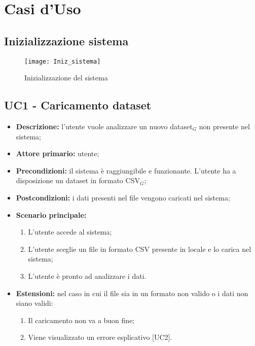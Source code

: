 \chapter{Casi d'Uso}
\section*{Inizializzazione sistema}

\begin{figure}[ht]
  \centering
  \texttt{[image: Iniz\_sistema]}
  \caption{Inizializzazione del sistema}
\end{figure}
\section{UC1 - Caricamento dataset}
\begin{itemize}
  \item \textbf{Descrizione:} l'utente vuole analizzare un nuovo dataset$_G$ non presente nel sistema;
  \item \textbf{Attore primario:} utente;
  \item \textbf{Precondizioni:} il sistema è raggiungibile e funzionante. L’utente ha a disposizione un dataset in formato CSV$_G$;
  \item \textbf{Postcondizioni:} i dati presenti nel file vengono caricati nel sistema;
  \item \textbf{Scenario principale:}
  \begin{enumerate}
    \item L'utente accede al sistema;
    \item L'utente sceglie un file in formato CSV presente in locale e lo carica nel sistema;
    \item L'utente è pronto ad analizzare i dati.
  \end{enumerate}
  \item \textbf{Estensioni:} nel caso in cui il file sia in un formato non valido o i dati non siano validi:
    \begin{enumerate}
      \item Il caricamento non va a buon fine;
      \item Viene visualizzato un errore esplicativo [UC2].
    \end{enumerate}
\end{itemize}

